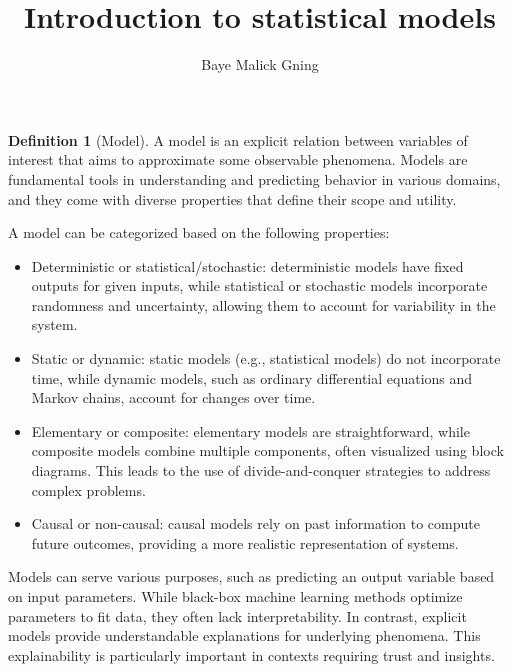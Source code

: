 \documentclass[12pt, a4paper]{article}
\author{Baye Malick Gning}
\date{}
\title{Introduction to statistical models}
\theoremstyle{definition}
\newtheorem{definition}{Definition}[section]
\numberwithin{figure}{section}
\numberwithin{equation}{section}
\numberwithin{table}{section}
\begin{document}
\maketitle
\vspace{2cm}


\newpage
\tableofcontents
\newpage



\begin{definition}[Model]
A model is an explicit relation between variables of interest that aims to approximate some observable phenomena. Models are fundamental tools in understanding and predicting behavior in various domains, and they come with diverse properties that define their scope and utility.
    

A model can be categorized based on the following properties:
\begin{itemize}
    \item Deterministic or statistical/stochastic: deterministic models have fixed outputs for given inputs, while statistical or stochastic models incorporate randomness and uncertainty, allowing them to account for variability in the system.
    \item Static or dynamic: static models (e.g., statistical models) do not incorporate time, while dynamic models, such as ordinary differential equations and Markov chains, account for changes over time.
    \item Elementary or composite: elementary models are straightforward, while composite models combine multiple components, often visualized using block diagrams. This leads to the use of divide-and-conquer strategies to address complex problems.
    \item Causal or non-causal: causal models rely on past information to compute future outcomes, providing a more realistic representation of systems. \\
\end{itemize}
\end{definition}


Models can serve various purposes, such as predicting an output variable based on input parameters. While black-box machine learning methods optimize parameters to fit data, they often lack interpretability. In contrast, explicit models provide understandable explanations for underlying phenomena. This explainability is particularly important in contexts requiring trust and insights.
\end{document}
